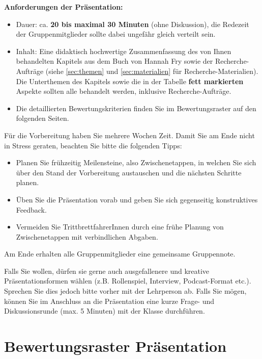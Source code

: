\textbf{Anforderungen der Präsentation:}
\begin{itemize}
	\item Dauer: ca. \textbf{20 bis maximal 30 Minuten} (ohne Diskussion), die Redezeit der Gruppenmitglieder sollte dabei ungefähr gleich verteilt sein.
	\item Inhalt: Eine didaktisch hochwertige Zusammenfassung des von Ihnen behandelten Kapitels aus dem Buch von Hannah Fry sowie der Recherche-Aufträge (siehe \cref{sec:themen} und \cref{sec:materialien} für Recherche-Materialien). Die Unterthemen des Kapitels sowie die in der Tabelle \textbf{fett markierten} Aspekte sollten alle behandelt werden, inklusive Recherche-Aufträge.
	\item Die detaillierten Bewertungskriterien finden Sie im Bewertungsraster auf den folgenden Seiten.
\end{itemize}

\begin{myattention} Für die Vorbereitung haben Sie mehrere Wochen Zeit. Damit Sie am Ende nicht in Stress geraten, beachten Sie bitte die folgenden Tipps:
\begin{itemize}
	\item Planen Sie frühzeitig Meilensteine, also Zwischenetappen, in welchen Sie sich über den Stand der Vorbereitung austauschen und die nächsten Schritte planen.
	\item Üben Sie die Präsentation vorab und geben Sie sich gegenseitig konstruktives Feedback.
	\item Vermeiden Sie TrittbrettfahrerInnen durch eine frühe Planung von Zwischenetappen mit verbindlichen Abgaben.
\end{itemize}

Am Ende erhalten alle Gruppenmitglieder eine gemeinsame Gruppennote.
\end{myattention}

Falls Sie wollen, dürfen sie gerne auch ausgefallenere und kreative Präsentationsformen wählen (z.B. Rollenspiel, Interview, Podcast-Format etc.). Sprechen Sie dies jedoch bitte vorher mit der Lehrperson ab. Falls Sie mögen, können Sie im Anschluss an die Präsentation eine kurze Frage- und Diskussionsrunde (max. 5 Minuten) mit der Klasse durchführen.

\newpage
\restoregeometry
\pagestyle{empty}

\section*{Bewertungsraster Präsentation}

